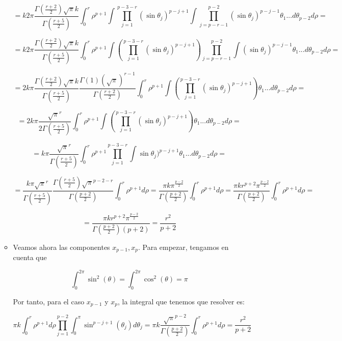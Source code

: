 \documentclass{article}
\theoremstyle{theorem-style}  %
\theoremstyle{definition}
\theoremstyle{example-style}
\begin{document}
\begin{itemize}
\begin{itemize}
			\[
				= k 2\pi \frac{\Gamma(\frac{r+2}{2}) \sqrt{\pi} k }{ \Gamma(\frac{r+5}{2})}  \int_0^r \rho^{p+1}  \int \prod_{j = 1}^{p-3-r} (\sin \theta_j)^{p-j+1} \int \prod_{j = p-r-1}^{p-2}(\sin \theta_j)^{p-j-1} \theta_1 ... d\theta_{p-2} d\rho=
			\]
			
			\[
				 = k 2\pi \frac{\Gamma(\frac{r+2}{2}) \sqrt{\pi} k }{ \Gamma(\frac{r+5}{2})}  \int_0^r \rho^{p+1} \int (\prod_{j = 1}^{p-3-r} (\sin \theta_j)^{p-j+1})  \prod_{j = p-r-1}^{p-2} \int (\sin \theta_j)^{p-j-1} \theta_1 ... d\theta_{p-2} d\rho= 
			\]
			
			\[
			 = 2 k \pi \frac{\Gamma(\frac{r+2}{2}) \sqrt{\pi} k }{ \Gamma(\frac{r+5}{2})}  \frac{\Gamma(1) (\sqrt{\pi})^{r-1}}{\Gamma(\frac{r+2}{2})}  \int_0^r \rho^{p+1}  \int (\prod_{j = 1}^{p-3-r} (\sin \theta_j)^{p-j+1})  \theta_1 ... d\theta_{p-2} d\rho = 
			 \]
			 
			 \[
			= 2 k \pi \frac{\sqrt{\pi}^r}{2 \Gamma(\frac{r+5}{2})} \int_0^r \rho^{p+1}  \int (\prod_{j = 1}^{p-3-r} (\sin \theta_j)^{p-j+1})  \theta_1 ... d\theta_{p-2} d\rho =
			\]
			
			\[
			 = k \pi \frac{\sqrt{\pi}^r}{\Gamma(\frac{r+5}{2})} \int_0^r \rho^{p+1}  \prod_{j = 1}^{p-3-r}  \int \sin \theta_j)^{p-j+1}  \theta_1 ... d\theta_{p-2} d\rho  = 
			 \]
			 
			 \[
			  = \frac{ k \pi \sqrt{\pi}^r}{\Gamma(\frac{r+5}{2})} \frac{\Gamma(\frac{r+5}{2}) \sqrt{\pi}^{p-2-r}}{\Gamma(\frac{p+2}{2})} \int_0^r \rho^{p+1}  d\rho = \frac{\pi k \pi^{\frac{p-2}{2}}}{\Gamma(\frac{p+2}{2})} \int_0^r \rho^{p+1} d\rho = \frac{\pi k r ^{p+2} \pi^{\frac{p-2}{2}}}{ \Gamma(\frac{p+2}{2})} \int_0^r \rho^{p+1} d\rho = 
			\]
			
			\[
			 =  \frac{\pi k r ^{p+2} \pi^{\frac{p-2}{2}}}{ \Gamma(\frac{p+2}{2})(p+2)} = \frac{r^2}{p+2}
			\]
			
			\item Veamos ahora las componentes $x_{p-1}, x_p$. Para empezar, tengamos en cuenta que 
			
			\[
				\int_{0}^{2 \pi} \sin^2(\theta) = \int_{0}^{2 \pi} \cos^2(\theta) = \pi
			\]

			Por tanto, para el caso $x_{p-1}$ y $x_p$, la integral que tenemos que resolver es:
			
			\[
				\pi k \int_{0}^{r} \rho^{p+1} d\rho \prod_{j = 1}^{p-2} \int_{0}^{\pi} \sin^{p-j+1}(\theta_j) d\theta_j =  \pi k \frac{\sqrt{\pi}^{p-2}}{\Gamma(\frac{p+2}{2})} \int_{0}^{r} \rho^{p+1} d\rho = \frac{r^2}{p+2}
			\]
					

\end{itemize}
\end{itemize}
\end{document}
